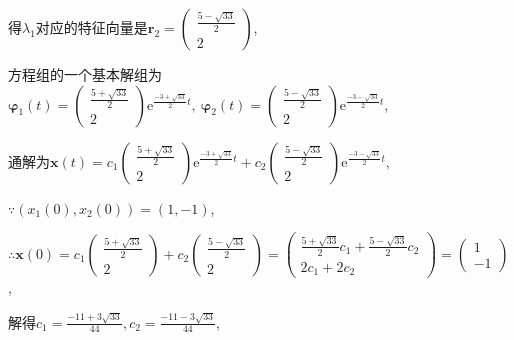 \documentclass[12pt,UTF8]{ctexart}
\newcommand{\me}[0]{\mathrm e}
\begin{document}
\begin{enumerate}
得$\lambda_1$对应的特征向量是$\bm r_2=\begin{pmatrix}\frac{5-\sqrt{33}}2\\2\end{pmatrix}$,

方程组的一个基本解组为$\bm\varphi_1(t)=\begin{pmatrix}\frac{5+\sqrt{33}}2\\2\end{pmatrix}\me^{\frac{-3+\sqrt{33}}2t},\ \bm\varphi_2(t)=\begin{pmatrix}\frac{5-\sqrt{33}}2\\2\end{pmatrix}\me^{\frac{-3-\sqrt{33}}2t}$,

通解为$\bm x(t)=c_1\begin{pmatrix}\frac{5+\sqrt{33}}2\\2\end{pmatrix}\me^{\frac{-3+\sqrt{33}}2t}+c_2\begin{pmatrix}\frac{5-\sqrt{33}}2\\2\end{pmatrix}\me^{\frac{-3-\sqrt{33}}2t}$,

$\because(x_1(0),x_2(0))=(1,-1)$,

$\therefore\bm x(0)=c_1\begin{pmatrix}\frac{5+\sqrt{33}}2\\2\end{pmatrix}+c_2\begin{pmatrix}\frac{5-\sqrt{33}}2\\2\end{pmatrix}=\begin{pmatrix}\frac{5+\sqrt{33}}2c_1+\frac{5-\sqrt{33}}2c_2\\2c_1+2c_2\end{pmatrix}=\begin{pmatrix}1\\-1\end{pmatrix}$,

解得$c_1=\frac{-11+3\sqrt{33}}{44},c_2=\frac{-11-3\sqrt{33}}{44}$,


\end{enumerate}
\end{document}
